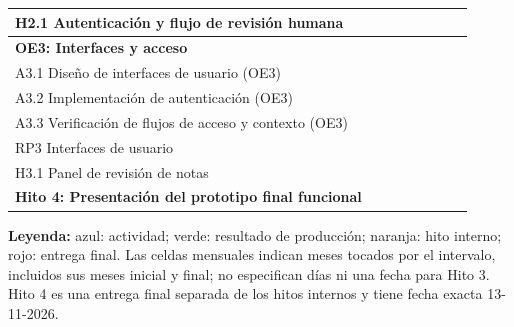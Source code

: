 \begin{table}[H]
{{\begin{tabular}{|l|c|c|c|c|c|c|c|}
H2.1 Autenticación y flujo de revisión humana & & & \cellcolor{orange!30} & \cellcolor{orange!30} & \cellcolor{orange!30} & \cellcolor{orange!30} & \cellcolor{orange!30} \\ \hline
\textbf{OE3: Interfaces y acceso} & & & & & \cellcolor{blue!20} & \cellcolor{blue!20} & \cellcolor{blue!20} \\ \hline
A3.1 Diseño de interfaces de usuario (OE3) & & & & & \cellcolor{blue!30} & \cellcolor{blue!30} & \\ \hline
A3.2 Implementación de autenticación (OE3) & & & & & & \cellcolor{blue!30} & \cellcolor{blue!30} \\ \hline
A3.3 Verificación de flujos de acceso y contexto (OE3) & & & & & & \cellcolor{blue!30} & \cellcolor{blue!30} \\ \hline
RP3 Interfaces de usuario & & & & & \cellcolor{green!30} & \cellcolor{green!30} & \cellcolor{green!30} \\ \hline
H3.1 Panel de revisión de notas & & & & & & \cellcolor{orange!30} & \\ \hline
\textbf{Hito 4: Presentación del prototipo final funcional} & & & & & & & \cellcolor{red!35} \\ \hline
\end{tabular}
}}
\end{table}

\noindent\textbf{Leyenda:} azul: actividad; verde: resultado de producción; naranja: hito interno; rojo: entrega final. Las celdas mensuales indican meses tocados por el intervalo, incluidos sus meses inicial y final; no especifican días ni una fecha para Hito 3. Hito 4 es una entrega final separada de los hitos internos y tiene fecha exacta 13-11-2026.
